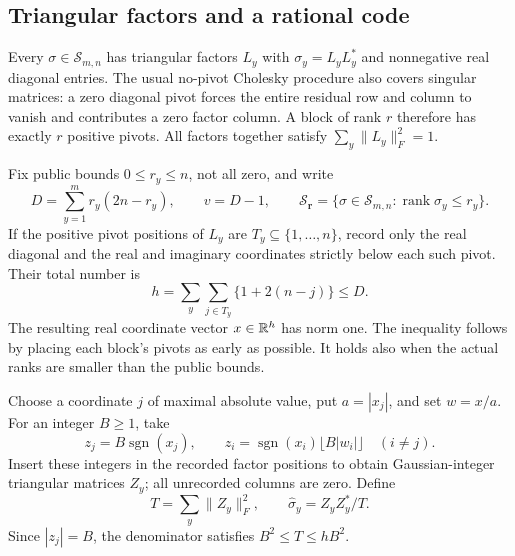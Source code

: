 \subsection{Triangular factors and a rational code}
Every $\sigma\in\mathcal S_{m,n}$ has triangular factors
$L_y$ with $\sigma_y=L_yL_y^*$ and nonnegative real diagonal entries.
The usual no-pivot Cholesky procedure also covers singular matrices:
a zero diagonal pivot forces the entire residual row and column to
vanish and contributes a zero factor column. A block of rank $r$
therefore has exactly $r$ positive pivots. All factors together satisfy
$\sum_y\|L_y\|_F^2=1$.

Fix public bounds $0\le r_y\le n$, not all zero, and write
\begin{equation}\label{eq:rankdimension68}
 D=\sum_{y=1}^m r_y(2n-r_y),\qquad v=D-1,
 \qquad
 \mathcal S_{\boldsymbol r}
   =\{\sigma\in\mathcal S_{m,n}:\operatorname{rank}\sigma_y\le r_y\}.
\end{equation}
If the positive pivot positions of $L_y$ are $T_y\subseteq\{1,\ldots,n\}$,
record only the real diagonal and the real and imaginary coordinates
strictly below each such pivot. Their total number is
\[
 h=\sum_y\sum_{j\in T_y}\{1+2(n-j)\}\le D.
\]
The resulting real coordinate vector $x\in\mathbb R^h$ has norm one.
The inequality follows by placing each block's pivots as early as
possible. It holds also when the actual ranks are smaller than the
public bounds.

Choose a coordinate $j$ of maximal absolute value, put $a=|x_j|$,
and set $w=x/a$. For an integer $B\ge1$, take
\begin{equation}\label{eq:factorgrid68}
 z_j=B\operatorname{sgn}(x_j),\qquad
 z_i=\operatorname{sgn}(x_i)\lfloor B|w_i|\rfloor\quad(i\ne j).
\end{equation}
Insert these integers in the recorded factor positions to obtain
Gaussian-integer triangular matrices $Z_y$; all unrecorded columns
are zero. Define
\begin{equation}\label{eq:factoroutput68}
 T=\sum_y\|Z_y\|_F^2,\qquad
 \widehat\sigma_y=Z_yZ_y^*/T.
\end{equation}
Since $|z_j|=B$, the denominator satisfies $B^2\le T\le hB^2$.

